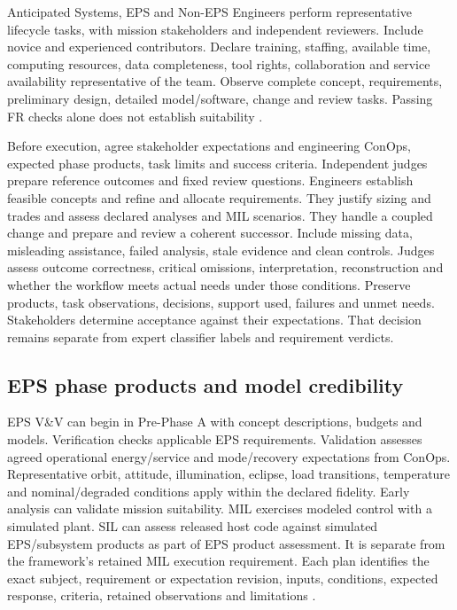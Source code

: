 Anticipated Systems, EPS and Non-EPS Engineers perform representative lifecycle tasks, with mission stakeholders and independent reviewers. Include novice and experienced contributors. Declare training, staffing, available time, computing resources, data completeness, tool rights, collaboration and service availability representative of the team. Observe complete concept, requirements, preliminary design, detailed model/software, change and review tasks. Passing FR checks alone does not establish suitability \citep[Sec.~5.4 and Appendix~E]{nasa2016systems}.

Before execution, agree stakeholder expectations and engineering ConOps, expected phase products, task limits and success criteria. Independent judges prepare reference outcomes and fixed review questions. Engineers establish feasible concepts and refine and allocate requirements. They justify sizing and trades and assess declared analyses and MIL scenarios. They handle a coupled change and prepare and review a coherent successor. Include missing data, misleading assistance, failed analysis, stale evidence and clean controls. Judges assess outcome correctness, critical omissions, interpretation, reconstruction and whether the workflow meets actual needs under those conditions. Preserve products, task observations, decisions, support used, failures and unmet needs. Stakeholders determine acceptance against their expectations. That decision remains separate from expert classifier labels and requirement verdicts.

\subsection{EPS phase products and model credibility}

EPS V\&V can begin in Pre-Phase A with concept descriptions, budgets and models. Verification checks applicable EPS requirements. Validation assesses agreed operational energy/service and mode/recovery expectations from ConOps. Representative orbit, attitude, illumination, eclipse, load transitions, temperature and nominal/degraded conditions apply within the declared fidelity. Early analysis can validate mission suitability. MIL exercises modeled control with a simulated plant. SIL can assess released host code against simulated EPS/subsystem products as part of EPS product assessment. It is separate from the framework's retained MIL execution requirement. Each plan identifies the exact subject, requirement or expectation revision, inputs, conditions, expected response, criteria, retained observations and limitations \citep[Secs.~2.4, 5.3--5.4 and~6.1.1.2.4]{nasa2016systems}.

